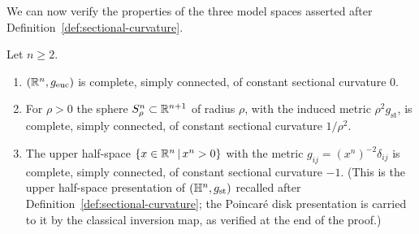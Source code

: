 We can now verify the properties of the three model spaces asserted
after Definition~\ref{def:sectional-curvature}.

\begin{lemma}
\label{lem:model-spaces}


Let $n\ge2$.
\begin{enumerate}
\item $(\mathbb{R}^n,g_{\mathrm{euc}})$ is complete, simply connected, of
constant sectional curvature $0$.
\item For $\rho>0$ the sphere $S^n_\rho\subset\mathbb{R}^{n+1}$ of radius
$\rho$, with the induced metric $\rho^2g_{\mathrm{st}}$, is
complete, simply connected, of constant sectional curvature
$1/\rho^2$.
\item The upper half-space $\{x\in\mathbb{R}^n\,|\,x^n>0\}$ with the
metric $g_{ij}=(x^n)^{-2}\delta_{ij}$ is complete, simply
connected, of constant sectional curvature $-1$. (This is the
upper half-space presentation of $(\mathbb{H}^n,g_{\mathrm{st}})$
recalled after Definition~\ref{def:sectional-curvature}; the
Poincar\'e disk presentation is carried to it by the classical
inversion map, as verified at the end of the proof.)
\end{enumerate}
\end{lemma}

